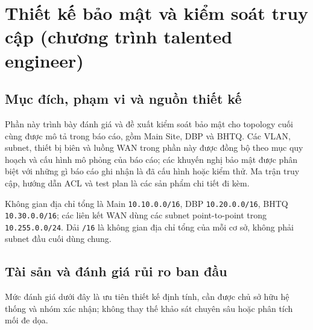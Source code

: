 \section{Thiết kế bảo mật và kiểm soát truy cập (chương trình talented engineer)}
\label{sec:security_architecture}

\subsection{Mục đích, phạm vi và nguồn thiết kế}
Phần này trình bày đánh giá và đề xuất kiểm soát bảo mật cho topology cuối cùng được mô tả trong báo cáo, gồm Main Site, DBP và BHTQ. Các VLAN, subnet, thiết bị biên và luồng WAN trong phần này được đồng bộ theo mục quy hoạch và cấu hình mô phỏng của báo cáo; các khuyến nghị bảo mật được phân biệt với những gì báo cáo ghi nhận là đã cấu hình hoặc kiểm thử. Ma trận truy cập, hướng dẫn ACL và test plan là các sản phẩm chi tiết đi kèm.

Không gian địa chỉ tổng là Main \texttt{10.10.0.0/16}, DBP \texttt{10.20.0.0/16}, BHTQ \texttt{10.30.0.0/16}; các liên kết WAN dùng các subnet point-to-point trong \texttt{10.255.0.0/24}. Dải \texttt{/16} là không gian địa chỉ tổng của mỗi cơ sở, không phải subnet đầu cuối dùng chung.

\subsection{Tài sản và đánh giá rủi ro ban đầu}
Mức đánh giá dưới đây là ưu tiên thiết kế định tính, cần được chủ sở hữu hệ thống và nhóm xác nhận; không thay thế khảo sát chuyên sâu hoặc phân tích mối đe dọa.

